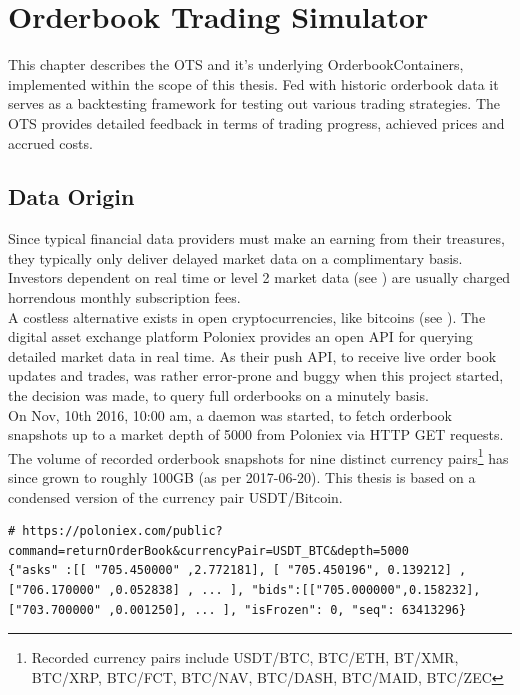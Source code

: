 \chapter{Orderbook Trading Simulator}
\label{chap:simulator}
This chapter describes the \ac{OTS} and it's underlying OrderbookContainers, implemented within the scope of this thesis. Fed with historic orderbook data it serves as a backtesting framework for testing out various trading strategies. The \ac{OTS} provides detailed feedback in terms of trading progress, achieved prices and accrued costs.

\section{Data Origin}
\label{chap:dataorigin}
Since typical financial data providers must make an earning from their treasures, they typically only deliver delayed market data on a complimentary basis. Investors dependent on real time or level 2 market data (see ) are usually charged horrendous monthly subscription fees.\\

A costless alternative exists in open cryptocurrencies, like bitcoins (see ). The digital asset exchange platform Poloniex \cite{poloniex} provides an open API for querying detailed market data in real time. As their push API, to receive live order book updates and trades, was rather error-prone and buggy when this project started, the decision was made, to query full orderbooks on a minutely basis.\\

On Nov, 10th 2016, 10:00 am, a daemon was started, to fetch orderbook snapshots up to a market depth of 5000 from Poloniex via HTTP GET requests. The volume of recorded orderbook snapshots for nine distinct currency pairs\footnote{Recorded currency pairs include USDT/BTC, BTC/ETH, BT/XMR, BTC/XRP, BTC/FCT, BTC/NAV, BTC/DASH, BTC/MAID, BTC/ZEC} has since grown to roughly 100GB (as per 2017-06-20). This thesis is based on a condensed version of the currency pair USDT/Bitcoin.

\begin{lstlisting}[frame=single, breaklines=true, basicstyle=\scriptsize, caption=Data fetched from Poloniex via HTTP GET request, label=lst:PoloniexFetch]
# https://poloniex.com/public?command=returnOrderBook&currencyPair=USDT_BTC&depth=5000
{"asks" :[[ "705.450000" ,2.772181], [ "705.450196", 0.139212] ,["706.170000" ,0.052838] , ... ], "bids":[["705.000000",0.158232],["703.700000" ,0.001250], ... ], "isFrozen": 0, "seq": 63413296}
\end{lstlisting}

